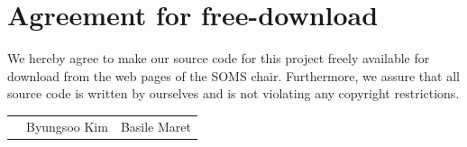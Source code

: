 \documentclass[11pt]{article}
\begin{document}

\newpage


\newpage
\section*{Agreement for free-download}
\bigskip


\bigskip


\large We hereby agree to make our source code for this project freely available for download from the web pages of the SOMS chair. Furthermore, we assure that all source code is written by ourselves and is not violating any copyright restrictions.

\begin{center}

\bigskip


\bigskip


\begin{tabular}{@{}p{3.3cm}@{}p{6cm}@{}@{}p{6cm}@{}}
\begin{minipage}{3cm}

\end{minipage}
&
\begin{minipage}{6cm}
\vspace{2mm} \large Byungsoo Kim

 \vspace{\baselineskip}

\end{minipage}
&
\begin{minipage}{6cm}

\large Basile Maret

\end{minipage}
\end{tabular}


\end{center}
\newpage









\tableofcontents
\end{document}
